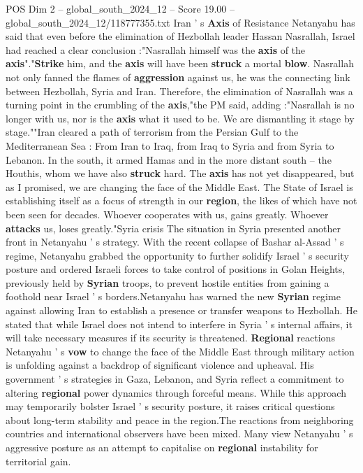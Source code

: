 \begin{textsample}{POS Dim 2 – global\_south\_2024\_12 – Score 19.00 – global\_south\_2024\_12/118777355.txt}
Iran ' s \textbf{Axis} of Resistance Netanyahu has said that even before the elimination of Hezbollah leader Hassan Nasrallah, Israel had reached a clear conclusion :"Nasrallah himself was the \textbf{axis} of the \textbf{axis}"."\textbf{Strike} him, and the \textbf{axis} will have been \textbf{struck} a mortal \textbf{blow}.
Nasrallah not only fanned the flames of \textbf{aggression} against us, he was the connecting link between Hezbollah, Syria and Iran.
Therefore, the elimination of Nasrallah was a turning point in the crumbling of the \textbf{axis},"the PM said, adding :"Nasrallah is no longer with us, nor is the \textbf{axis} what it used to be.
We are dismantling it stage by stage.""Iran cleared a path of terrorism from the Persian Gulf to the Mediterranean Sea : From Iran to Iraq, from Iraq to Syria and from Syria to Lebanon.
In the south, it armed Hamas and in the more distant south -- the Houthis, whom we have also \textbf{struck} hard.
The \textbf{axis} has not yet disappeared, but as I promised, we are changing the face of the Middle East.
The State of Israel is establishing itself as a focus of strength in our \textbf{region}, the likes of which have not been seen for decades.
Whoever cooperates with us, gains greatly.
Whoever \textbf{attacks} us, loses greatly."Syria crisis The situation in Syria presented another front in Netanyahu ' s strategy.
With the recent collapse of Bashar al-Assad ' s regime, Netanyahu grabbed the opportunity to further solidify Israel ' s security posture and ordered Israeli forces to take control of positions in Golan Heights, previously held by \textbf{Syrian} troops, to prevent hostile entities from gaining a foothold near Israel ' s borders.Netanyahu has warned the new \textbf{Syrian} regime against allowing Iran to establish a presence or transfer weapons to Hezbollah.
He stated that while Israel does not intend to interfere in Syria ' s internal affairs, it will take necessary measures if its security is threatened. \textbf{Regional} reactions Netanyahu ' s \textbf{vow} to change the face of the Middle East through military action is unfolding against a backdrop of significant violence and upheaval.
His government ' s strategies in Gaza, Lebanon, and Syria reflect a commitment to altering \textbf{regional} power dynamics through forceful means.
While this approach may temporarily bolster Israel ' s security posture, it raises critical questions about long-term stability and peace in the region.The reactions from neighboring countries and international observers have been mixed.
Many view Netanyahu ' s aggressive posture as an attempt to capitalise on \textbf{regional} instability for territorial gain.

\end{textsample}

